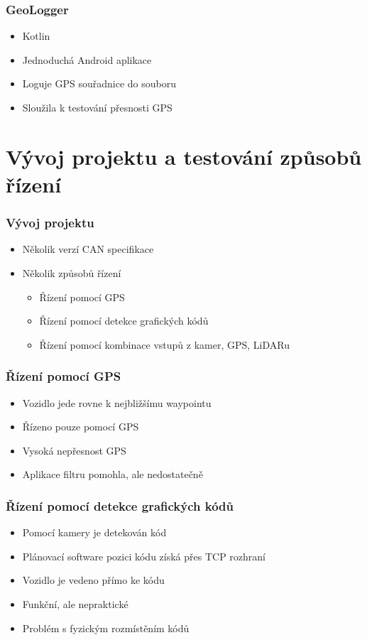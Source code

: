 \documentclass{beamer}
\begin{document}
\begin{frame}
    \frametitle{GeoLogger}
    \begin{itemize}
        \item Kotlin
        \item Jednoduchá Android aplikace
        \item Loguje GPS souřadnice do souboru
        \item Sloužila k testování přesnosti GPS
    \end{itemize}
\end{frame}

\section{Vývoj projektu a testování způsobů řízení}

\begin{frame}
    \frametitle{Vývoj projektu}
    \begin{itemize}
        \item Několik verzí CAN specifikace
        \item Několik způsobů řízení
            \begin{itemize}
                \item Řízení pomocí GPS
                \item Řízení pomocí detekce grafických kódů
                \item Řízení pomocí kombinace vstupů z kamer, GPS, LiDARu
            \end{itemize}
    \end{itemize}
\end{frame}

\begin{frame}
    \frametitle{Řízení pomocí GPS}
    \begin{itemize}
        \item Vozidlo jede rovne k nejbližšímu waypointu
        \item Řízeno pouze pomocí GPS
        \item Vysoká nepřesnost GPS
        \item Aplikace filtru pomohla, ale nedostatečně
    \end{itemize}
\end{frame}

\begin{frame}
    \frametitle{Řízení pomocí detekce grafických kódů}
    \begin{itemize}
        \item Pomocí kamery je detekován kód
        \item Plánovací software pozici kódu získá přes TCP rozhraní
        \item Vozidlo je vedeno přímo ke kódu
        \item Funkční, ale nepraktické
        \item Problém s fyzickým rozmístěním kódů
    \end{itemize}
\end{frame}
\end{document}
